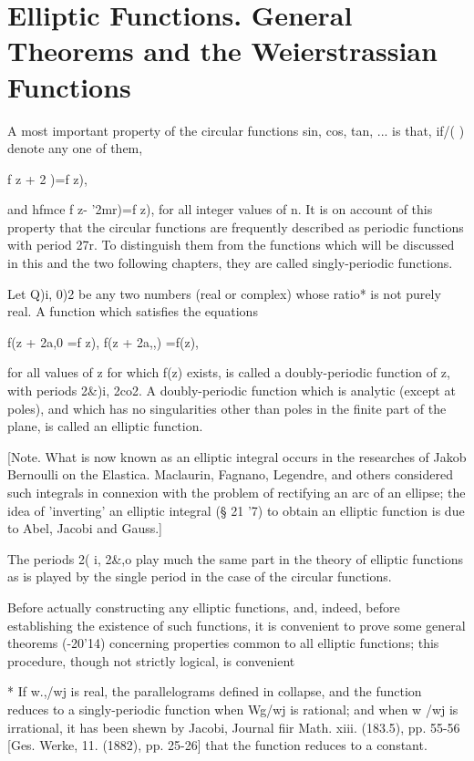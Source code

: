 \chapter{Elliptic Functions. General Theorems and the 
Weierstrassian Functions} 


A most important property of the circular functions sin, cos, tan,
... is that, if/( ) denote any one of them,

f z + 2 )=f z),

and hfmce f z- '2mr)=f z), for all integer values of n. It is on
account of this property that the circular functions are frequently
described as periodic functions with period 27r. To distinguish them
from the functions which will be discussed in this and the two
following chapters, they are called singly-periodic functions.

Let Q)i, 0)2 be any two numbers (real or complex) whose ratio* is not
purely real. A function which satisfies the equations

f(z + 2a,0 =f z), f(z + 2a,,) =f(z),

for all values of z for which f(z) exists, is called a doubly-periodic
function of z, with periods 2\&)i, 2co2. A doubly-periodic function
which is analytic (except at poles), and which has no singularities
other than poles in the finite part of the plane, is called an
elliptic function.

[Note. What is now known as an elliptic integral occurs in the
researches of Jakob Bernoulli on the Elastica. Maclaurin, Fagnano,
Legendre, and others considered such integrals in connexion with the
problem of rectifying an arc of an ellipse; the idea of 'inverting'
an elliptic integral (§ 21 '7) to obtain an elliptic function is due
to Abel, Jacobi and Gauss.]

The periods 2( i, 2\&,o play much the same part in the theory of
elliptic functions as is played by the single period in the case of
the circular functions.

Before actually constructing any elliptic functions, and, indeed,
before establishing the existence of such functions, it is convenient
to prove some general theorems (-20'14) concerning properties
common to all elliptic functions; this procedure, though not strictly
logical, is convenient

* If w.,/wj is real, the parallelograms defined in collapse,
and the function reduces to a singly-periodic function when Wg/wj is
rational; and when w /wj is irrational, it has been shewn by Jacobi,
Journal fiir Math. xiii. (183.5), pp. 55-56 [Ges. Werke, 11. (1882),
pp. 25-26] that the function reduces to a constant.

